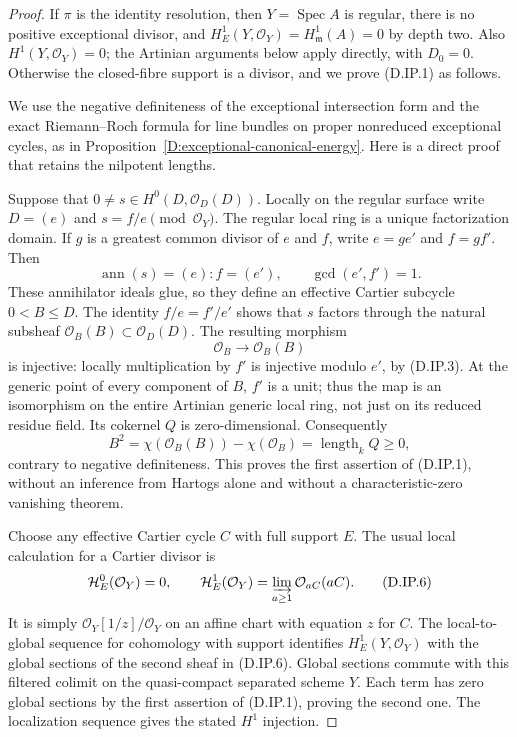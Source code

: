 \begin{proof}
If $\pi$ is the identity resolution, then $Y=\operatorname{Spec}A$
is regular, there is no positive exceptional divisor, and
$H^1_E(Y,\mathcal O_Y)=H^1_{\mathfrak m}(A)=0$ by depth two.
Also $H^1(Y,\mathcal O_Y)=0$; the Artinian arguments below
apply directly, with $D_0=0$. Otherwise the closed-fibre
support is a divisor, and we prove (D.IP.1) as follows.

We use the negative definiteness of the exceptional
intersection form and the exact Riemann--Roch formula for
line bundles on proper nonreduced exceptional cycles,
as in Proposition~\ref{D:exceptional-canonical-energy}.
Here is a direct proof that retains the nilpotent lengths.

Suppose that $0\ne s\in H^0(D,\mathcal O_D(D))$.
Locally on the regular surface write $D=(e)$ and
$s=f/e\pmod{\mathcal O_Y}$. The regular local ring is a
unique factorization domain. If $g$ is a greatest common
divisor of $e$ and $f$, write $e=ge'$ and $f=gf'$.
Then
\[
              \operatorname{ann}(s)=(e):f=(e'),
              \qquad \gcd(e',f')=1.                  \tag{D.IP.3}
\]
These annihilator ideals glue, so they define an effective
Cartier subcycle $0<B\le D$. The identity $f/e=f'/e'$
shows that $s$ factors through the natural subsheaf
$\mathcal O_B(B)\subset\mathcal O_D(D)$.
The resulting morphism
\[
                  \mathcal O_B\longrightarrow\mathcal O_B(B)
                                                               \tag{D.IP.4}
\]
is injective: locally multiplication by $f'$ is injective
modulo $e'$, by (D.IP.3). At the generic point of every
component of $B$, $f'$ is a unit; thus the map is an
isomorphism on the entire Artinian generic local ring,
not just on its reduced residue field. Its cokernel $Q$
is zero-dimensional. Consequently
\[
  B^2=\chi(\mathcal O_B(B))-\chi(\mathcal O_B)
      =\operatorname{length}_k Q\ge0,                 \tag{D.IP.5}
\]
contrary to negative definiteness. This proves the first
assertion of (D.IP.1), without an inference from Hartogs
alone and without a characteristic-zero vanishing theorem.

Choose any effective Cartier cycle $C$ with full support
$E$. The usual local calculation for a Cartier divisor is
\[
 \mathcal H^0_E(\mathcal O_Y)=0,\qquad
 \mathcal H^1_E(\mathcal O_Y)
       =\varinjlim_{a\ge1}\mathcal O_{aC}(aC).
                                                               \tag{D.IP.6}
\]
It is simply $\mathcal O_Y[1/z]/\mathcal O_Y$ on an affine
chart with equation $z$ for $C$. The local-to-global
sequence for cohomology with support identifies
$H^1_E(Y,\mathcal O_Y)$ with the global sections of the
second sheaf in (D.IP.6). Global sections commute with
this filtered colimit on the quasi-compact separated
scheme $Y$. Each term has zero global sections by the
first assertion of (D.IP.1), proving the second one.
The localization sequence gives the stated $H^1$
injection.


\end{proof}
